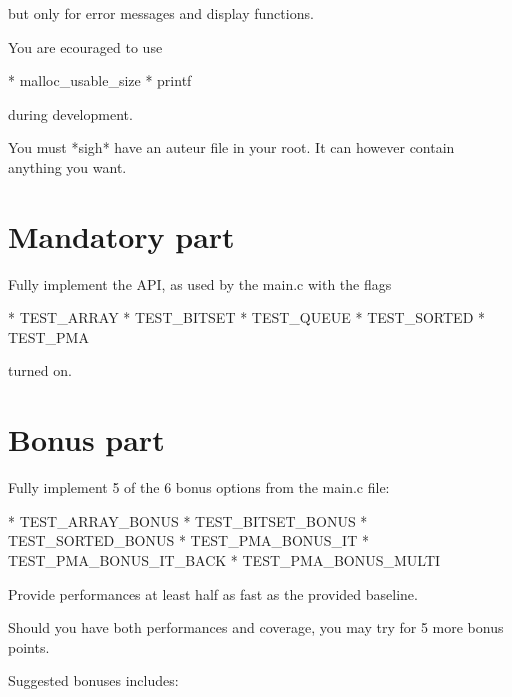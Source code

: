 \documentclass{42-en}
\begin{document}
    but only for error messages and display functions. 

    You are ecouraged to use

        * malloc_usable_size
        * printf

    during development.

    You must *sigh* have an auteur file in your root. It can however contain anything you want.




\chapter{Mandatory part}

    Fully implement the API, as used by the main.c with the flags 

    * TEST_ARRAY
    * TEST_BITSET
    * TEST_QUEUE
    * TEST_SORTED
    * TEST_PMA

    turned on. 

\chapter{Bonus part}

    Fully implement 5 of the 6 bonus options from the main.c file:

    * TEST_ARRAY_BONUS
    * TEST_BITSET_BONUS
    * TEST_SORTED_BONUS
    * TEST_PMA_BONUS_IT
    * TEST_PMA_BONUS_IT_BACK
    * TEST_PMA_BONUS_MULTI

    Provide performances at least half as fast as the provided baseline.

    Should you have both performances and coverage, you may try for 5 more bonus points.

    Suggested bonuses includes:
\end{document}
